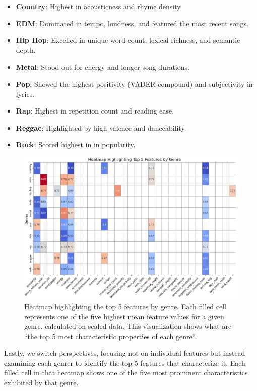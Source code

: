 \begin{itemize}
  \item \textbf{Country}: Highest in acousticness and rhyme density.
  \item \textbf{EDM}: Dominated in tempo, loudness, and featured the most
    recent songs.
  \item \textbf{Hip Hop}: Excelled in unique word count, lexical richness, and
    semantic depth.
  \item \textbf{Metal}: Stood out for energy and longer song durations.
  \item \textbf{Pop}: Showed the highest positivity (VADER compound) and
    subjectivity in lyrics.
  \item \textbf{Rap}: Highest in repetition count and reading ease.
  \item \textbf{Reggae}: Highlighted by high valence and danceability.
  \item \textbf{Rock}: Scored highest in in popularity.
    
\end{itemize}

\begin{center}
\begin{figure}[H]
  \centering
  \includegraphics[width=6in]{img/heatmap_top_feature_values_by_genre.png}
  \caption{Heatmap highlighting the top 5 features by genre. Each filled cell
    represents one of the five highest mean feature values for a given genre,
    calculated on scaled data. This visualization shows what are ``the top 5
    most characteristic properties of each genre``. }
  \label{Figure:dendrogram_spotify_features}
\end{figure}
\end{center}

Lastly, we switch perspectives, focusing not on individual features but instead
examining each genrer to identify the top 5 features that characterize it. Each
filled cell in that heatmap shows one of the five most prominent
characteristics exhibited by that genre.

